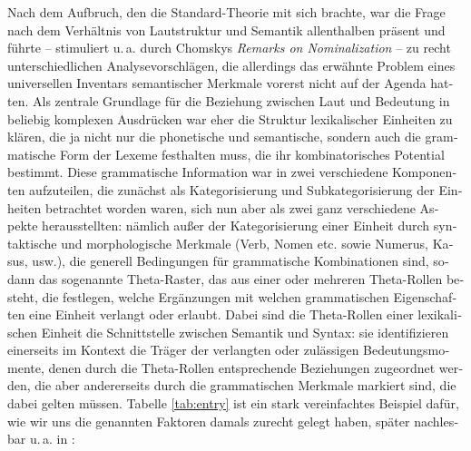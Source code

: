\documentclass[output=paper,colorlinks,citecolor=brown]{langscibook}
\begin{document}
\begin{otherlanguage}{german}
Nach dem Aufbruch, den die Standard-Theorie mit sich brachte, war die Frage nach dem Verhältnis von Lautstruktur und Semantik allenthalben präsent und führte -- stimuliert u.\,a. durch Chomskys \textit{Remarks on Nominalization} \citep{Chomsky1970} -- zu recht unterschiedlichen Analysevorschlägen, die allerdings das erwähnte Problem eines universellen Inventars semantischer Merkmale vorerst nicht auf der Agenda hatten. Als zentrale Grundlage für die Beziehung zwischen Laut und Bedeutung in beliebig komplexen Ausdrücken war eher die Struktur lexikalischer Einheiten zu klären, die ja nicht nur die phonetische und semantische, sondern auch die grammatische Form der Lexeme festhalten muss, die ihr kombinatorisches Potential bestimmt. Diese grammatische Information war in zwei verschiedene Komponenten aufzuteilen, die zunächst als Kategorisierung und Subkategorisierung der Einheiten betrachtet worden waren, sich nun aber als zwei ganz verschiedene Aspekte herausstellten: nämlich außer der Kategorisierung einer Einheit durch syntaktische und morphologische Merkmale (Verb, Nomen etc. sowie Numerus, Kasus, usw.), die generell Bedingungen für grammatische Kombinationen sind, sodann das sogenannte \glqq Theta-Raster\grqq, das aus einer oder mehreren Theta-Rollen besteht, die festlegen, welche Ergänzungen mit welchen grammatischen Eigenschaften eine Einheit verlangt oder erlaubt. Dabei sind die Theta-Rollen einer lexikalischen Einheit die Schnittstelle zwischen Semantik und Syntax: sie identifizieren einerseits im Kontext die Träger der verlangten oder zulässigen Bedeutungsmomente, denen durch die Theta-Rollen entsprechende Beziehungen zugeordnet werden, die aber andererseits durch die grammatischen Merkmale markiert sind, die dabei gelten müssen. Tabelle \ref{tab:entry} ist ein stark vereinfachtes Beispiel dafür, wie wir uns die genannten Faktoren damals zurecht gelegt haben, später nachlesbar u.\,a. in \citet{Bierwisch1988,Bierwisch1990}:



\end{otherlanguage}
\end{document}
